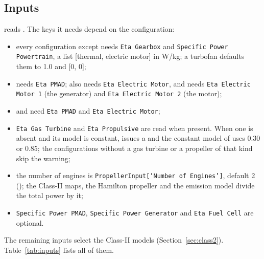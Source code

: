 \documentclass[a4paper,11pt]{article}
\begin{document}
\subsection{Inputs}
 reads . The keys it needs
depend on the configuration:
\begin{itemize}
\item every configuration except  needs \texttt{Eta Gearbox} and
  \texttt{Specific Power Powertrain}, a list [thermal, electric motor] in W/kg; a turbofan
  defaults them to 1.0 and [0, 0];
\item {} needs \texttt{Eta PMAD};  also needs
  \texttt{Eta Electric Motor}, and  needs \texttt{Eta Electric Motor 1} (the
  generator) and \texttt{Eta Electric Motor 2} (the motor);
\item {} and  need \texttt{Eta PMAD} and
  \texttt{Eta Electric Motor};
\item \texttt{Eta Gas Turbine} and \texttt{Eta Propulsive} are read when present. When one is
  absent and its model is constant,  issues a  and the
  constant model of  uses 0.30 or 0.85; the configurations without
  a gas turbine or a propeller of that kind skip the warning;
\item the number of engines is \texttt{PropellerInput['Number of Engines']}, default 2
  (); the Class-II maps, the Hamilton propeller and the emission
  model divide the total power by it;
\item \texttt{Specific Power PMAD}, \texttt{Specific Power Generator} and \texttt{Eta Fuel Cell}
  are optional.
\end{itemize}
The remaining inputs select the Class-II models (Section~\ref{sec:class2}).
Table~\ref{tab:inputs} lists all of them.
\end{document}
